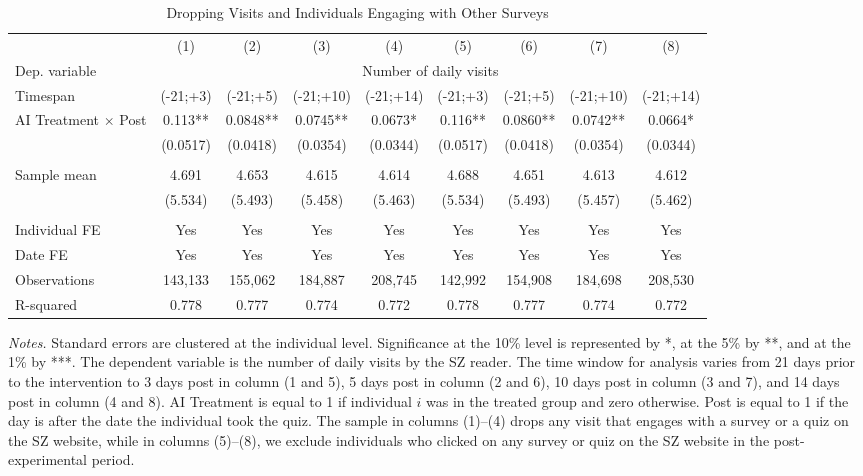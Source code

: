  \begin{table}[H]
 \centering 
 \caption{Dropping Visits and Individuals Engaging with Other Surveys} 
 \label{tab:results_visits_drop_post_surveytakers} 
 \begin{adjustbox}{max width=\textwidth} 
\begin{tabular}{lcccccccc} 
 \toprule
& (1) & (2) & (3) & (4) & (5) & (6) & (7) & (8)  \\
 Dep. variable & \multicolumn{8}{c}{Number of daily visits} \\ 
 \cmidrule(lr){2-9} 
Timespan & (-21;+3) & (-21;+5) & (-21;+10) & (-21;+14) & (-21;+3) & (-21;+5) & (-21;+10) & (-21;+14) \\
 \midrule 
AI Treatment $\times$ Post&    0.113** &   0.0848** &   0.0745** &   0.0673*  &    0.116** &   0.0860** &   0.0742** &   0.0664*  \\
                & (0.0517)   & (0.0418)   & (0.0354)   & (0.0344)   & (0.0517)   & (0.0418)   & (0.0354)   & (0.0344)   \\
& & & & & & & &  \\
Sample mean&      4.691 &      4.653 &      4.615 &      4.614 &      4.688 &      4.651 &      4.613 &      4.612  \\
& (5.534) & (5.493) & (5.458) & (5.463) & (5.534) & (5.493) & (5.457) & (5.462)  \\
& & & & & & & &  \\
Individual FE & Yes & Yes & Yes & Yes & Yes & Yes & Yes & Yes\\
Date FE & Yes & Yes & Yes & Yes & Yes & Yes & Yes & Yes\\
 \midrule
Observations &    143,133 &    155,062 &    184,887 &    208,745 &    142,992 &    154,908 &    184,698 &    208,530  \\
R-squared&      0.778 &      0.777 &      0.774 &      0.772 &      0.778 &      0.777 &      0.774 &      0.772  \\
 \bottomrule
 \end{tabular}
 \end{adjustbox}
 \par
 \begin{minipage}{0.99\linewidth}
 \baselineskip9pt {\scriptsize \vspace{0.1cm} { \it Notes.} Standard errors are clustered at the individual level. Significance at the 10\% level is represented by *, at the 5\% by **, and at the 1\% by ***. The dependent variable is the number of daily visits by the SZ reader. The time window for analysis varies from 21 days prior to the intervention to 3 days post in column (1 and 5), 5 days post in column (2 and 6), 10 days post in column (3 and 7), and 14 days post in column (4 and 8). AI Treatment is equal to 1 if individual $i$ was in the treated group and zero otherwise. Post is equal to 1 if the day is after the date the individual took the quiz. The sample in columns (1)--(4) drops any visit that engages with a survey or a quiz on the SZ website, while in columns (5)--(8), we exclude individuals who clicked on any survey or quiz on the SZ website in the post-experimental period.}
 \end{minipage}
 \end{table}
